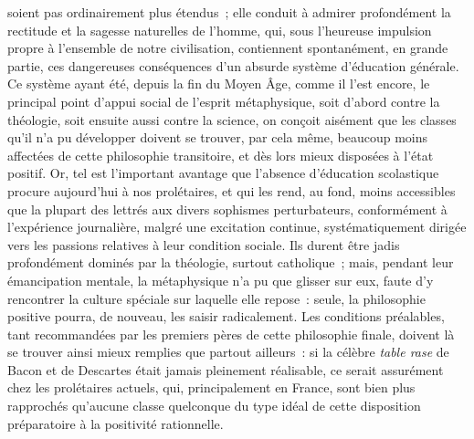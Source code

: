 \documentclass[french,twoside]{book} %
\begin{document}
soient pas ordinairement plus étendus ; elle conduit à admirer profondément la rectitude et la sagesse naturelles de l’homme, qui, sous l’heureuse impulsion propre à l’ensemble de notre civilisation, contiennent spontanément, en grande partie, ces dangereuses conséquences d’un absurde système d’éducation générale. Ce système ayant été, depuis la fin du Moyen Âge, comme il l’est encore, le principal point d’appui social de l’esprit métaphysique, soit d’abord contre la théologie, soit ensuite aussi contre la science, on conçoit aisément que les classes qu’il n’a pu développer doivent se trouver, par cela même, beaucoup moins affectées de cette philosophie transitoire, et dès lors mieux disposées à l’état positif. Or, tel est l’important avantage que l’absence d’éducation scolastique procure aujourd’hui à nos prolétaires, et qui les rend, au fond, moins accessibles que la plupart des lettrés aux divers sophismes perturbateurs, conformément à l’expérience journalière, malgré une excitation continue, systématiquement dirigée vers les passions relatives à leur condition sociale. Ils durent être jadis profondément dominés par la théologie, surtout catholique ; mais, pendant leur émancipation mentale, la métaphysique n’a pu que glisser sur eux, faute d’y rencontrer la culture spéciale sur laquelle elle repose : seule, la philosophie positive pourra, de nouveau, les saisir radicalement. Les conditions préalables, tant recommandées par les premiers pères de cette philosophie finale, doivent là se trouver ainsi mieux remplies que partout ailleurs : si la célèbre {\itshape table rase} de Bacon et de Descartes était jamais pleinement réalisable, ce serait assurément chez les prolétaires actuels, qui, principalement en France, sont bien plus rapprochés qu’aucune classe quelconque du type idéal de cette disposition préparatoire à la positivité rationnelle.\par
\end{document}
